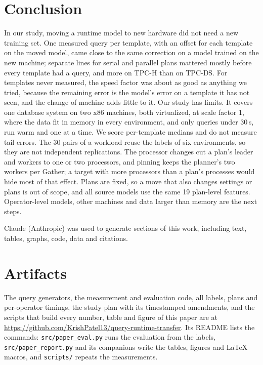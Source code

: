\documentclass[sigconf,review]{acmart}
\begin{document}
\section{Conclusion}
\label{sec:conclusion}
In our study, moving a runtime model to new hardware did not need a new
training set. One measured query per template, with an offset for each
template on the moved model, came close to the same correction on a model
trained on the new machine; separate lines for serial and parallel plans
mattered mostly before every template had a query, and more on TPC-H than
on TPC-DS. For templates never measured, the speed factor was about as
good as anything we tried, because the remaining error is the model's error
on a template it has not seen, and the change of machine adds little to it.
Our study has limits. It covers one database system on two x86 machines,
both virtualized, at scale factor 1, where the data fit in memory in every
environment, and only queries under 30\,s, run warm and one at a time. We
score per-template medians and do not measure tail errors. The 30 pairs of
a workload reuse the labels of six environments, so they are not
independent replications. The processor changes cut a
plan's leader and workers to one or two processors, and pinning keeps the
planner's two workers per Gather; a target with more processors than a
plan's processes would hide most of that effect. Plans are fixed, so a
move that also changes settings or plans is out of scope, and all source
models use the same 19 plan-level features. Operator-level models, other
machines and data larger than memory are the next steps.

\begin{acks}
Claude (Anthropic) was used to generate sections of this work, including
text, tables, graphs, code, data and citations.
\end{acks}

\section*{Artifacts}
{\sloppy The query generators, the measurement and evaluation code, all
labels, plans and per-operator timings, the study plan with its timestamped
amendments, and the scripts that build every number, table and figure of
this paper are at \url{https://github.com/KrishPatel13/query-runtime-transfer}. Its
README lists the commands: \texttt{src/paper\_eval.py} runs the evaluation
from the labels, \texttt{src/paper\_report.py} and its companions write
the tables, figures and \LaTeX{} macros, and \texttt{scripts/} repeats the
measurements.\par}

\balance


\end{document}
